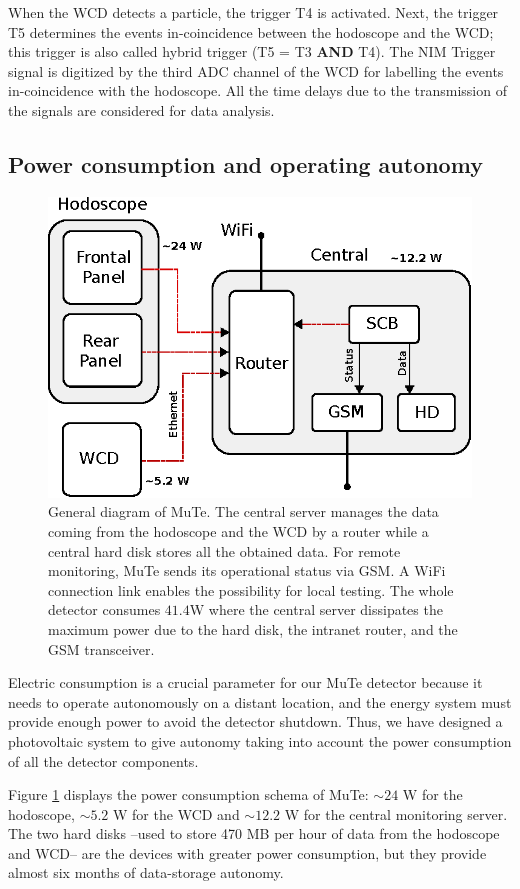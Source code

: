 \documentclass[letterpaper,11pt]{article}
\begin{document}
When the WCD detects a particle, the trigger T4 is activated. Next, the trigger T5 determines the events in-coincidence between the hodoscope and the WCD; this trigger is also called hybrid trigger (T5 = T3 \textbf{AND} T4). The NIM Trigger signal is digitized by the third ADC channel of the WCD for labelling the events in-coincidence with the hodoscope. All the time delays due to the transmission of the signals are considered for data analysis.

\subsection{Power consumption and operating autonomy}

\begin{figure}[htb]
\centering
\includegraphics[width=0.6\columnwidth]{Figures/Total.eps}
\caption{General diagram of MuTe. The central server manages the data coming from the hodoscope and the WCD by a router while a central hard disk stores all the obtained data. For remote monitoring, MuTe sends its operational status via GSM. A WiFi connection link enables the possibility for local testing. The whole detector consumes $41.4$W where the central server dissipates the maximum power due to the hard disk, the intranet router, and the GSM transceiver.}
\label{fig:power}
\end{figure}

Electric consumption is a crucial parameter for our MuTe detector because it needs to operate autonomously on a distant location, and the energy system must provide enough power to avoid the detector shutdown. Thus, we have designed a photovoltaic system to give autonomy taking into account the power consumption of all the detector components. 

Figure \ref{fig:power} displays the power consumption schema of MuTe: $\sim 24$ W for the hodoscope,  $\sim 5.2$ W for the WCD  and $\sim 12.2$ W for the central monitoring server. The two hard disks  --used to store 470 MB per hour of data from the hodoscope and WCD-- are the devices with greater power consumption, but they provide almost six months of data-storage autonomy.
\end{document}

